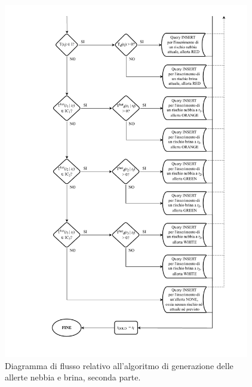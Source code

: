 \begin{figure}[h!]
	\centering
	\includegraphics[height=590px]{./Iterazione 3/OtherFiles/FC - Generatore allerte F&F(2).pdf}
	\caption{Diagramma di flusso relativo all'algoritmo di generazione delle allerte nebbia e brina, seconda parte.}
	\label{fig:FFFlowChart2}
\end{figure}